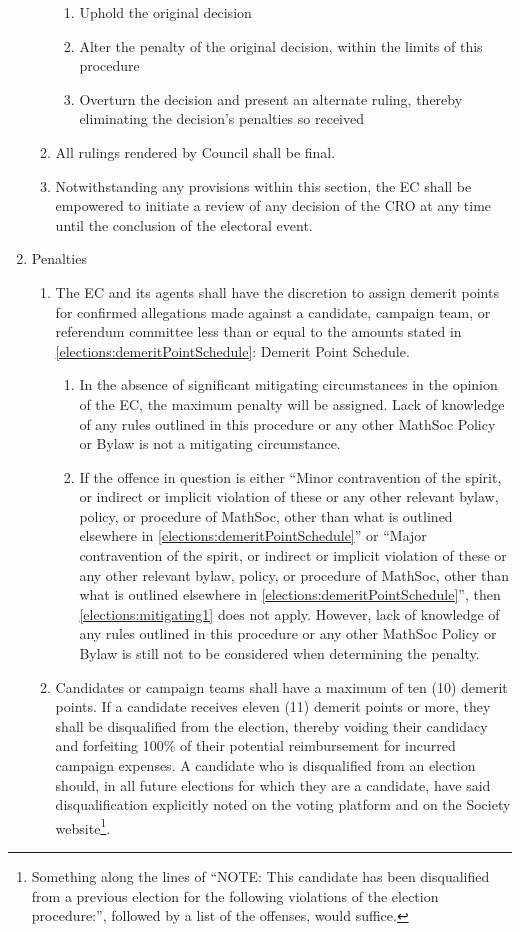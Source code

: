 \begin{enumerate}
\begin{enumerate}
\begin{enumerate}
					\item Uphold the original decision
					\item Alter the penalty of the original decision, within the limits of this procedure
					\item Overturn the decision and present an alternate ruling, thereby eliminating the decision's penalties so received
				\end{enumerate}
			\item All rulings rendered by Council shall be final.
			\item Notwithstanding any provisions within this section, the EC shall be empowered to initiate a review of any decision of the CRO at any time until the conclusion of the electoral event.
		\end{enumerate}
	\item Penalties
		\begin{enumerate}
			\item The EC and its agents shall have the discretion to assign demerit points for confirmed allegations made against a candidate, campaign team, or referendum committee less than or equal to the amounts stated in \cref{elections:demeritPointSchedule}: Demerit Point Schedule.
				\begin{enumerate}
					\item \label{elections:mitigating1} In the absence of significant mitigating circumstances in the opinion of the EC, the maximum penalty will be assigned. Lack of knowledge of any rules outlined in this procedure or any other MathSoc Policy or Bylaw is not a mitigating circumstance.
					\item If the offence in question is either ``Minor contravention of the spirit, or indirect or implicit violation of these or any other relevant bylaw, policy, or procedure of MathSoc, other than what is outlined elsewhere in \cref{elections:demeritPointSchedule}'' or ``Major contravention of the spirit, or indirect or implicit violation of these or any other relevant bylaw, policy, or procedure of MathSoc, other than what is outlined elsewhere in \cref{elections:demeritPointSchedule}'', then \cref{elections:mitigating1} does not apply. However, lack of knowledge of any rules outlined in this procedure or any other MathSoc Policy or Bylaw is still not to be considered when determining the penalty.
				\end{enumerate}
			\item Candidates or campaign teams shall have a maximum of ten (10) demerit points. If a candidate receives eleven (11) demerit points or more, they shall be disqualified from the election, thereby voiding their candidacy and forfeiting 100\% of their potential reimbursement for incurred campaign expenses. A candidate who is disqualified from an election should, in all future elections for which they are a candidate, have said disqualification explicitly noted on the voting platform and on the Society website\footnote{Something along the lines of ``NOTE: This candidate has been disqualified from a previous election for the following violations of the election procedure:'', followed by a list of the offenses, would suffice.}.

\end{enumerate}
\end{enumerate}
